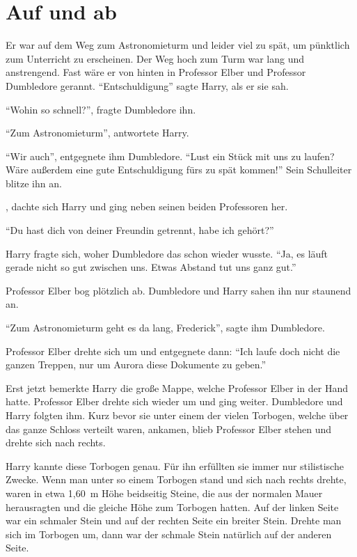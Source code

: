 \chapter{Auf und ab}


Er war auf dem Weg zum Astronomieturm und leider viel zu spät, um pünktlich zum Unterricht zu erscheinen. Der Weg hoch zum Turm war lang und anstrengend. Fast wäre er von hinten in Professor Elber und Professor Dumbledore gerannt. \enquote{Entschuldigung} sagte Harry, als er sie sah.

\enquote{Wohin so schnell?}, fragte Dumbledore ihn.

\enquote{Zum Astronomieturm}, antwortete Harry.

\enquote{Wir auch}, entgegnete ihm Dumbledore. \enquote{Lust ein Stück mit uns zu laufen? Wäre außerdem eine gute Entschuldigung fürs zu spät kommen!} Sein Schulleiter blitze ihn an.

, dachte sich Harry und ging neben seinen beiden Professoren her.

\enquote{Du hast dich von deiner Freundin getrennt, habe ich gehört?}

Harry fragte sich, woher Dumbledore das schon wieder wusste. \enquote{Ja, es läuft gerade nicht so gut zwischen uns. Etwas Abstand tut uns ganz gut.}

Professor Elber bog plötzlich ab. Dumbledore und Harry sahen ihn nur staunend an.

\enquote{Zum Astronomieturm geht es da lang, Frederick}, sagte ihm Dumbledore.

Professor Elber drehte sich um und entgegnete dann: \enquote{Ich laufe doch nicht die ganzen Treppen, nur um Aurora diese Dokumente zu geben.}

Erst jetzt bemerkte Harry die große Mappe, welche Professor Elber in der Hand hatte. Professor Elber drehte sich wieder um und ging weiter. Dumbledore und Harry folgten ihm. Kurz bevor sie unter einem der vielen Torbogen, welche über das ganze Schloss verteilt waren, ankamen, blieb Professor Elber stehen und drehte sich nach rechts.

Harry kannte diese Torbogen genau. Für ihn erfüllten sie immer nur stilistische Zwecke. Wenn man unter so einem Torbogen stand und sich nach rechts drehte, waren in etwa 1,60 m Höhe beidseitig Steine, die aus der normalen Mauer herausragten und die gleiche Höhe zum Torbogen hatten. Auf der linken Seite war ein schmaler Stein und auf der rechten Seite ein breiter Stein. Drehte man sich im Torbogen um, dann war der schmale Stein natürlich auf der anderen Seite.


